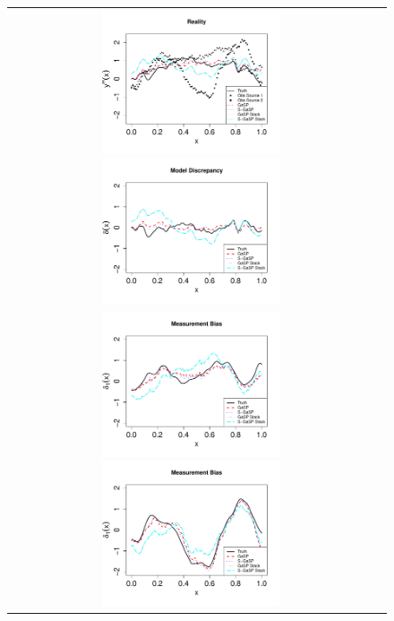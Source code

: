   
    \begin{figure}[t]
\centering
  \begin{tabular}{cc}

	\hspace{-.1in} \includegraphics[height=0.4\textwidth,width=0.5\textwidth]{figures/reality_k_5.pdf}
		\hspace{-.1in} \includegraphics[height=0.4\textwidth,width=0.5\textwidth]{figures/model_discrepancy_k_5.pdf} \vspace{-.3in} \\
	\hspace{-.1in} \includegraphics[height=0.4\textwidth,width=0.5\textwidth]{figures/measurement_bias_1_k_5.pdf}
	\hspace{-.1in} \includegraphics[height=0.4\textwidth,width=0.5\textwidth]{figures/measurement_bias_2_k_5.pdf}


\end{tabular}
\end{figure}
